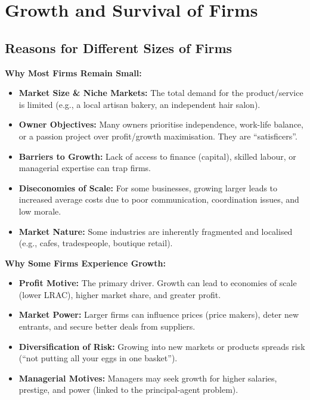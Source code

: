 \documentclass[11pt, a4paper, twoside]{book}
\begin{document}
\section{Growth and Survival of Firms}

\subsection{Reasons for Different Sizes of Firms}

\textbf{Why Most Firms Remain Small:}
\begin{itemize}
  \item \textbf{Market Size \& Niche Markets:} The total demand for the product/service is limited (e.g., a local artisan bakery, an independent hair salon).
  \item \textbf{Owner Objectives:} Many owners prioritise independence, work-life balance, or a passion project over profit/growth maximisation. They are ``satisficers''.
  \item \textbf{Barriers to Growth:} Lack of access to finance (capital), skilled labour, or managerial expertise can trap firms.
  \item \textbf{Diseconomies of Scale:} For some businesses, growing larger leads to increased average costs due to poor communication, coordination issues, and low morale.
  \item \textbf{Market Nature:} Some industries are inherently fragmented and localised (e.g., cafes, tradespeople, boutique retail).
\end{itemize}

\textbf{Why Some Firms Experience Growth:}
\begin{itemize}
  \item \textbf{Profit Motive:} The primary driver. Growth can lead to economies of scale (lower LRAC), higher market share, and greater profit.
  \item \textbf{Market Power:} Larger firms can influence prices (price makers), deter new entrants, and secure better deals from suppliers.
  \item \textbf{Diversification of Risk:} Growing into new markets or products spreads risk (``not putting all your eggs in one basket'').
  \item \textbf{Managerial Motives:} Managers may seek growth for higher salaries, prestige, and power (linked to the principal-agent problem).
\end{itemize}
\end{document}
